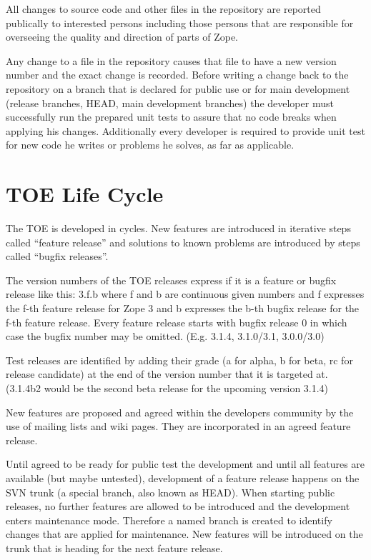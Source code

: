 \documentclass[12pt,english]{scrbook}
\begin{document}
All changes to source code and other files in the repository are reported
publically to interested persons including those persons that are responsible
for overseeing the quality and direction of parts of Zope.

Any change to a file in the repository causes that file to have a new version
number and the exact change is recorded. Before writing a change back to the
repository on a branch that is declared for public use or for main development
(release branches, HEAD, main development branches) the developer must
successfully run the prepared unit tests to assure that no code breaks when
applying his changes. Additionally every developer is required to provide unit
test for new code he writes or problems he solves, as far as applicable.





\section{TOE Life Cycle}

The TOE is developed in cycles. New features are introduced in iterative steps
called ``feature release'' and solutions to known problems are introduced by
steps called ``bugfix releases''.

The version numbers of the TOE releases express if it is a feature or bugfix
release like this: 3.f.b where f and b are continuous given numbers and f
expresses the f-th feature release for Zope 3 and b expresses the b-th bugfix
release for the f-th feature release. Every feature release starts with bugfix
release 0 in which case the bugfix number may be omitted. (E.g. 3.1.4,
3.1.0/3.1, 3.0.0/3.0)

Test releases are identified by adding their grade (a for alpha, b for beta,
  rc for release candidate) at the end of the version number that it is
targeted at.  (3.1.4b2 would be the second beta release for the upcoming
  version 3.1.4)

New features are proposed and agreed within the developers community by the use
of mailing lists and wiki pages. They are incorporated in an agreed feature
release.

Until agreed to be ready for public test the development and until all
features are available (but maybe untested), development of a feature release
happens on the SVN trunk (a special branch, also known as HEAD). When starting
public releases, no further features are allowed to be introduced and the
development enters maintenance mode. Therefore a named branch is created to
identify changes that are applied for maintenance.  New features will be
introduced on the trunk that is heading for the next feature release.
\end{document}
